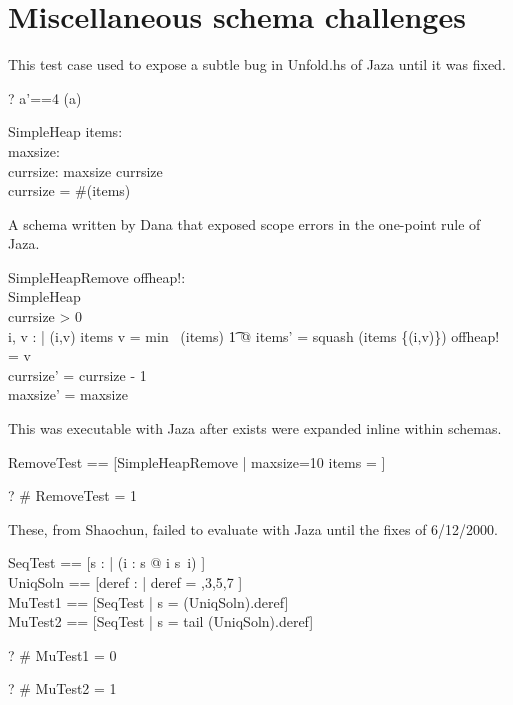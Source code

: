 \documentclass{article}
\begin{document}
\section{Miscellaneous schema challenges}


This test case used to expose a subtle bug in Unfold.hs of Jaza
until it was fixed.
\begin{zed} \vdash? \lblot a'==4 \rblot \in [Test1 | a=3] \hide(a) \end{zed}

\begin{schema}{SimpleHeap}
    items: \seq \nat \\
    maxsize: \nat \\
    currsize: \nat
\where
    maxsize \geq currsize \\
    currsize = \#(\ran items)
\end{schema}

A schema written by Dana that exposed scope errors in the one-point rule 
of Jaza.
\begin{schema}{SimpleHeapRemove}
    offheap!: \nat \\
    \Delta SimpleHeap \\
\where
    currsize > 0 \\
    \exists i, v : \nat | (i,v) \in items \land v = min~ (\ran items)
    \t1 @ items' = squash (items \setminus \{(i,v)\}) \land offheap! = v\\ 
    currsize' = currsize - 1 \\
    maxsize' = maxsize 
\end{schema}

This was executable with Jaza after exists were expanded inline within schemas.
\begin{zed}
  RemoveTest == [SimpleHeapRemove | maxsize=10 \land items =  \rangle]
\end{zed}
\begin{zed} \vdash? \# RemoveTest = 1 \end{zed}


These, from Shaochun, failed to evaluate with Jaza until the fixes of 6/12/2000.
\begin{zed}
  SeqTest  == [s : \seq \nat | (\forall i : \dom s @ i \neq s~i) ] \\
  UniqSoln == [deref : \seq \nat | deref = ,3,5,7 \rangle] \\
  MuTest1  == [SeqTest | s = (\mu UniqSoln).deref] \\
  MuTest2  == [SeqTest | s = tail (\mu UniqSoln).deref]
\end{zed}
\begin{zed} \vdash? \# MuTest1 = 0 \end{zed}
\begin{zed} \vdash? \# MuTest2 = 1 \end{zed}
\end{document}
